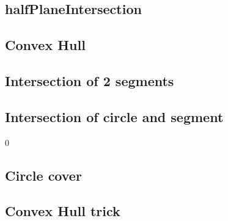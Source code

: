 \documentclass[a4paper,10pt,twocolumn,oneside]{article}
\begin{document}
\subsection{halfPlaneIntersection}


\subsection{Convex Hull}


%

\subsection{Intersection of 2 segments}


\subsection{Intersection of circle and segment}0


%

\subsection{Circle cover}


%

\subsection{Convex Hull trick}

\end{document}
